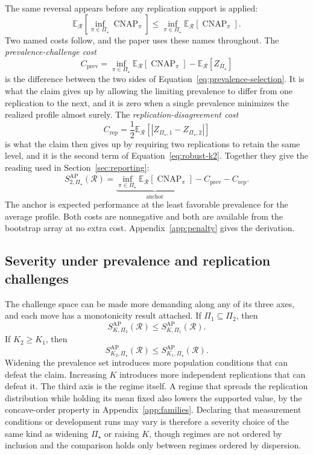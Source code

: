 \documentclass[11pt]{article}
\newcommand{\CNAP}{\operatorname{CNAP}}
\newcommand{\Regime}{\mathcal{R}}
\newcommand{\PSet}{\Pi_\star}
\newcommand{\E}{\mathbb{E}}
\theoremstyle{remark}
\begin{document}
The same reversal appears before any replication support is applied:
\begin{equation}
\E_{\Regime}
\left[
\inf_{\pi\in\PSet}\CNAP_\pi
\right]
\leq
\inf_{\pi\in\PSet}
\E_{\Regime}
\left[
\CNAP_\pi
\right].
\label{eq:prevalence-selection}
\end{equation}
Two named costs follow, and the paper uses these names throughout. The \emph{prevalence-challenge cost}
\[
C_{\mathrm{prev}}
=
\inf_{\pi\in\PSet}\E_{\Regime}[\CNAP_\pi]
-
\E_{\Regime}[Z_{\PSet}]
\]
is the difference between the two sides of Equation~\eqref{eq:prevalence-selection}. It is what the claim gives up by allowing the limiting prevalence to differ from one replication to the next, and it is zero when a single prevalence minimizes the realized profile almost surely. The \emph{replication-disagreement cost}
\[
C_{\mathrm{rep}}
=
\frac12
\E_{\Regime}
\left[
|Z_{\PSet,1}-Z_{\PSet,2}|
\right]
\]
is what the claim then gives up by requiring two replications to retain the same level, and it is the second term of Equation~\eqref{eq:robust-k2}. Together they give the reading used in Section~\ref{sec:reporting}:
\begin{equation}
S_{2,\PSet}^{\mathrm{AP}}(\Regime)
=
\underbrace{\inf_{\pi\in\PSet}\E_{\Regime}[\CNAP_\pi]}_{\text{anchor}}
-
C_{\mathrm{prev}}
-
C_{\mathrm{rep}}.
\label{eq:two-costs}
\end{equation}
The anchor is expected performance at the least favorable prevalence for the average profile. Both costs are nonnegative and both are available from the bootstrap array at no extra cost. Appendix~\ref{app:penalty} gives the derivation.

\subsection{Severity under prevalence and replication challenges}

The challenge space can be made more demanding along any of its three axes, and each move has a monotonicity result attached. If $\Pi_1\subseteq\Pi_2$, then
\begin{equation}
S_{K,\Pi_2}^{\mathrm{AP}}(\Regime)
\leq
S_{K,\Pi_1}^{\mathrm{AP}}(\Regime).
\label{eq:set-monotonicity}
\end{equation}
If $K_2\geq K_1$, then
\begin{equation}
S_{K_2,\PSet}^{\mathrm{AP}}(\Regime)
\leq
S_{K_1,\PSet}^{\mathrm{AP}}(\Regime).
\label{eq:k-monotonicity}
\end{equation}
Widening the prevalence set introduces more population conditions that can defeat the claim. Increasing $K$ introduces more independent replications that can defeat it. The third axis is the regime itself. A regime that spreads the replication distribution while holding its mean fixed also lowers the supported value, by the concave-order property in Appendix~\ref{app:families}. Declaring that measurement conditions or development runs may vary is therefore a severity choice of the same kind as widening $\PSet$ or raising $K$, though regimes are not ordered by inclusion and the comparison holds only between regimes ordered by dispersion.
\end{document}
